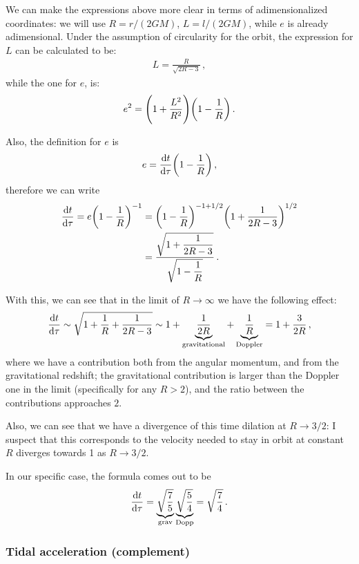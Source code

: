 \documentclass[main.tex]{subfiles}
\begin{document}
We can make the expressions above more clear in terms of adimensionalized coordinates: we will use \(R = r/(2GM)\), \(L = l / (2GM)\), while \(e\) is already adimensional. 
Under the assumption of circularity for the orbit, the expression for \(L\) can be calculated to be:
%
\begin{align}
  L  =\frac{R}{\sqrt{2 R - 3}}
\,,
\end{align}
%
while the one for \(e\), is: 
%
\begin{align}
  e^2 = \qty(1 + \frac{L^2}{R^2}) \qty(1 - \frac{1}{R})
\,.
\end{align}

Also, the definition for \(e\) is 
%
\begin{align}
  e = \dv{t}{\tau } \qty(1 - \frac{1}{R})
\,,
\end{align}
%
therefore we can write 
%
\begin{align}
  \dv{t}{ \tau } = e \qty(1-\frac{1}{R})^{-1} &= \qty(1 - \frac{1}{R})^{-1+1/2} \qty(1+ \frac{1}{2 R - 3})^{1/2} \\
  &= \frac{\sqrt{1 + \displaystyle \frac{1}{2R-3}}}{\sqrt{ 1- \displaystyle \frac{1}{R}}}
\,.
\end{align}

With this, we can see that in the limit of \(R \rightarrow \infty\) we have the following effect: 
%
\begin{align}
  \dv{t}{\tau } \sim \sqrt{1 + \frac{1}{R} + \frac{1}{2R-3} }
  \sim 1 + \underbrace{\frac{1}{2R}}_{\text{gravitational}} + \underbrace{\frac{1}{R}}_{\text{Doppler}} = 1 + \frac{3}{2R}
\,,
\end{align}
%
where we have a contribution both from the angular momentum, and from the gravitational redshift; the gravitational contribution is larger than the Doppler one in the limit (specifically for any \(R>2\)), and the ratio between the contributions approaches \(2\).

Also, we can see that we have a divergence of this time dilation at \(R \rightarrow 3/2\): 
I suspect that this corresponds to the velocity needed to stay in orbit at constant \(R\) diverges towards 1 as \(R \rightarrow 3/2\).

In our specific case, the formula comes out to be 
%
\begin{align}
  \dv{t}{\tau } = \underbrace{\sqrt{\frac{7}{5}}}_{\text{grav}} \underbrace{\sqrt{\frac{5}{4}}}_{\text{Dopp}} = \sqrt{\frac{7}{4}}
\,.
\end{align}

\subsubsection{Tidal acceleration (complement)}
\end{document}
